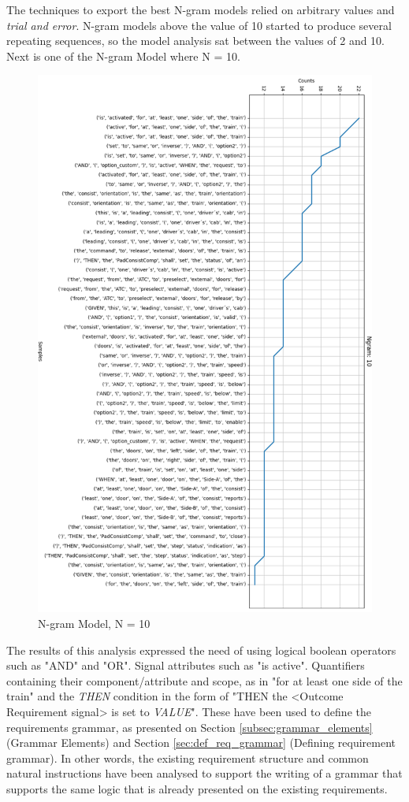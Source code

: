 The techniques to export the best N-gram models relied on arbitrary values and \textit{trial and error}. N-gram models above the value of 10 started to produce several repeating sequences, so the model analysis sat between the values of 2 and 10. Next is one of the N-gram Model where N = 10.

\begin{figure}[H]
    \centering
    \includegraphics[scale=0.6]{images/n_gram10_cut.png}
    \caption{N-gram Model, N = 10}
    \label{fig:n_gram_model_10}
\end{figure}

The results of this analysis expressed the need of using logical boolean operators such as "AND" and "OR". Signal attributes such as "is active". Quantifiers containing their component/attribute and scope, as in "for at least one side of the train" and the \textit{THEN} condition in the form of "THEN the <Outcome Requirement signal> is set to \textit{VALUE}".
These have been used to define the requirements grammar, as presented on Section \ref{subsec:grammar_elements} (Grammar Elements) and Section \ref{sec:def_req_grammar} (Defining requirement grammar). In other words, the existing requirement structure and common natural instructions have been analysed to support the writing of a grammar that supports the same logic that is already presented on the existing requirements.

